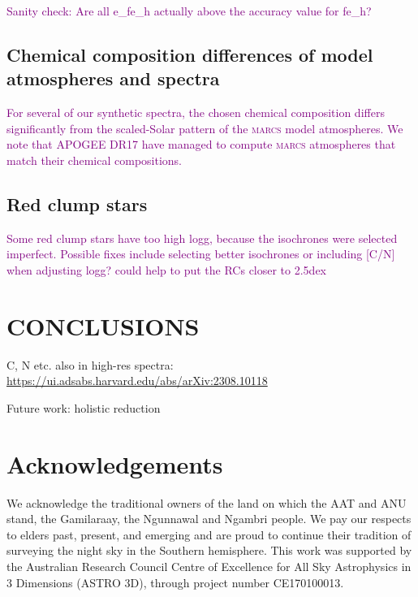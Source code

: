 \documentclass[
  journal=pasa,
  manuscript=research-paper, %
  year=2023,
  volume=37
]{cup-journal}
\newcommand{\SB}[1]{{\textcolor{purple}{#1}}}
\newcommand{\vrad}{$v_\mathrm{rad}$\xspace}
\newcommand{\marcs}{\textsc{marcs}\xspace}
\begin{document}

\SB{Sanity check: Are all e\_fe\_h actually above the accuracy value for fe\_h?}

\subsection{Chemical composition differences of model atmospheres and spectra}

\SB{For several of our synthetic spectra, the chosen chemical composition differs significantly from the scaled-Solar pattern of the \marcs model atmospheres. We note that APOGEE DR17 \citep{SDSSDR17} have managed to compute \marcs atmospheres that match their chemical compositions.}

\subsection{Red clump stars}

\SB{Some red clump stars have too high logg, because the isochrones were selected imperfect. Possible fixes include selecting better isochrones or including [C/N] when adjusting logg? could help to put the RCs closer to 2.5dex}

\section{CONCLUSIONS}
\label{sec:conclusion}

C, N etc. also in high-res spectra: \citep{Giribaldi2023} \url{https://ui.adsabs.harvard.edu/abs/arXiv:2308.10118}

Future work: holistic reduction \citep{Kos2018b,Saydjari2022}


\section*{Acknowledgements}

We acknowledge the traditional owners of the land on which the AAT and ANU stand, the Gamilaraay, the Ngunnawal and Ngambri people. We pay our respects to elders past, present, and emerging and are proud to continue their tradition of surveying the night sky in the Southern hemisphere.
This work was supported by the Australian Research Council Centre of Excellence for All Sky Astrophysics in 3 Dimensions (ASTRO 3D), through project number CE170100013.
\end{document}
